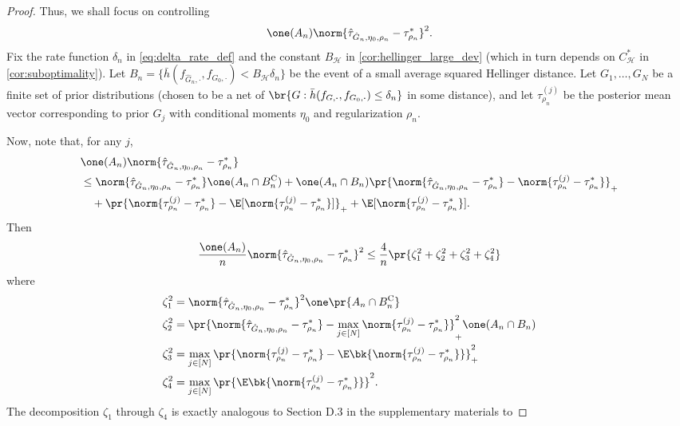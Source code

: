 \documentclass[12pt, reqno]{amsart}
\newcommand{\fs}[1]{f_{#1, \boldsymbol{\cdot}}}
\newcommand{\barh}{\bar h}
\newcommand{\Hyperparams}{\mathcal{H}}
\newcommand{\comp}{\mathrm{C}}
\numberwithin{equation}{section}
\begin{document}
\begin{refsection}
\begin{appendices}
\begin{proof}
Thus, we shall focus on controlling \[
\one(A_n) \norm{\hat \tau_{\hat G_n, \eta_0, \rho_n} - \tau^*_{\rho_n}}^2.
\]
Fix the rate function $\delta_n$ in \eqref{eq:delta_rate_def} and the constant
$B_\Hyperparams$ in \cref{cor:hellinger_large_dev} (which in turn depends on
$C^*_\Hyperparams$ in \cref{cor:suboptimality}). Let $B_{n} = \{\barh(\fs{\hat G_n},
\fs{G_0}) < B_\Hyperparams \delta_n\}$ be the event of a small average squared Hellinger
distance. Let $G_1,\ldots, G_N$ be a finite set of prior
distributions (chosen to be a net of $\br{G: \barh(\fs{G}, \fs{G_0}) \le \delta_n}$ in
some distance), and let $\tau^ {
(j)}_{\rho_n}$ be the posterior mean vector corresponding
to prior $G_j$ with conditional moments $\eta_0$ and regularization $\rho_n$.

Now, note that, for any $j$, \begin{align*}
&\one(A_n) \norm{\hat\tau_{\hat G_n, \eta_0, \rho_n} - \tau_{\rho_n}^*} \\
&\le 
\norm{\hat\tau_
{\hat G_n,
\eta_0, \rho_n} - \tau_{\rho_n}^*}\one(A_n \cap B_n^\comp) + \one(A_n \cap B_n) \pr{
\norm{\hat\tau_
{\hat G_n,
\eta_0, \rho_n} - \tau_{\rho_n}^*} - \norm{\tau_{\rho_n}^{(j)} - \tau_{\rho_n}^*}}_+ \\ 
&\quad+  \pr{ \norm{\tau_{\rho_n}^{(j)} - \tau_{\rho_n}^*} - \E[ \norm{\tau_{\rho_n}^{
(j)} - \tau_ {\rho_n}^*} ]}_+ +\E[ \norm{\tau_{\rho_n}^{(j)} - \tau_{\rho_n}^*} ].
\end{align*}
Then \[
\frac{\one(A_n)}{n} \norm{\hat \tau_{\hat G_n, \eta_0, \rho_n} - \tau^*_{\rho_n}}^2 \le
\frac{4}{n}\pr{\zeta_1^2 + \zeta_2^2 + \zeta_3^2 + \zeta_4^2}
\]
where \begin{align}
\zeta_1^2 &=  \norm{\hat \tau_{\hat G_n, \eta_0, \rho_n} - \tau^*_
{\rho_n}}^2 \one\pr{A_n \cap B_n^\comp}  \label{eq:zeta1}\\
\zeta_2^2 &= \pr{
    \norm{\hat\tau_{\hat G_n, \eta_0, \rho_n} - \tau^*_{\rho_n}} - \max_{j \in [N]}
    \norm{\tau_{\rho_n}^{(j)} - \tau_{\rho_n}^*}
}_+^2 \one(A_n \cap B_n)  \label{eq:zeta2}\\
\zeta_3^2 &= \max_{j\in [N]} \pr{
    \norm{\tau_{\rho_n}^{(j)} - \tau_{\rho_n}^*} - \E\bk{\norm{\tau_{\rho_n}^{(j)} - \tau_
    {\rho_n}^*}}
}^2_+  \label{eq:zeta3}\\
\zeta_4^2 &=  \max_{j\in [N]} \pr{\E\bk{\norm{\tau_{\rho_n}^{(j)} - \tau_
    {\rho_n}^*}}}^2. \label{eq:zeta4}
\end{align}
The decomposition $\zeta_1$ through $\zeta_4$ is exactly analogous to Section D.3 in the
supplementary materials to 

\end{proof}
\end{appendices}
\end{refsection}
\end{document}
